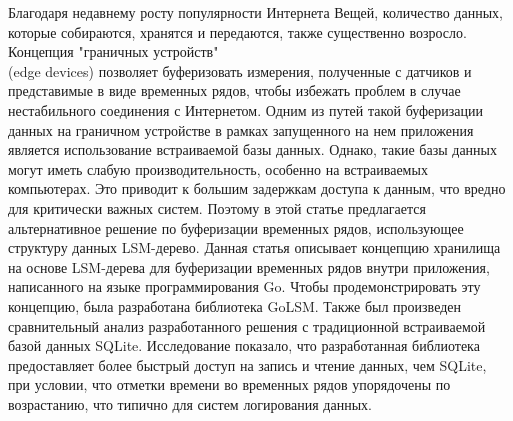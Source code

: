 Благодаря недавнему росту популярности Интернета Вещей, количество данных, которые собираются, хранятся и передаются, также существенно возросло. Концепция "граничных устройств"\\
(edge devices) позволяет буферизовать измерения, полученные с датчиков и представимые в виде временных рядов, чтобы избежать проблем в случае нестабильного соединения с Интернетом.
Одним из путей такой буферизации данных на граничном устройстве в рамках запущенного на нем приложения является использование встраиваемой базы данных. Однако, такие базы данных могут иметь слабую производительность, особенно на встраиваемых компьютерах. Это приводит к большим задержкам доступа к данным, что вредно для критически важных систем. Поэтому в этой статье предлагается альтернативное решение по буферизации временных рядов, использующее структуру данных LSM-дерево.
Данная статья описывает концепцию хранилища на основе LSM-дерева для буферизации временных рядов внутри приложения, написанного на языке программирования Go. Чтобы продемонстрировать эту концепцию, была разработана библиотека GoLSM. Также был произведен сравнительный анализ разработанного решения с традиционной встраиваемой базой данных SQLite. Исследование показало, что разработанная библиотека предоставляет более быстрый доступ на запись и чтение данных, чем SQLite, при условии, что отметки времени во временных рядов упорядочены по возрастанию, что типично для систем логирования данных.